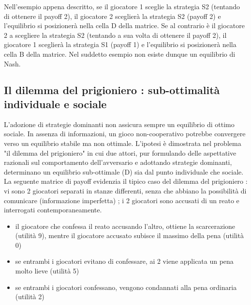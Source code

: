 Nell'esempio appena descritto, se il giocatore 1 sceglie la strategia S2 (tentando di ottenere il payoff 2), il giocatore 2 sceglierà la strategia S2 (payoff 2) e l'equilibrio si posizionerà nella cella D della matrice. Se al contrario è il giocatore 2 a scegliere la strategia S2 (tentando a sua volta di ottenere il payoff 2), il giocatore 1 sceglierà la strategia S1 (payoff 1) e l'equilibrio si posizionerà nella cella B della matrice. Nel suddetto esempio non esiste dunque un equilibrio di Nash.\\

\subsection{Il dilemma del prigioniero : sub-ottimalità individuale e sociale}
\justify
L'adozione di strategie dominanti non assicura sempre un equilibrio di ottimo sociale. In assenza di informazioni, un gioco non-cooperativo potrebbe convergere verso un equilibrio stabile ma non ottimale. L'ipotesi è dimostrata nel problema "il dilemma del prigioniero" in cui due attori, pur formulando delle aspettative razionali sul comportamento dell'avversario e adottando strategie dominanti, determinano un equilibrio sub-ottimale (D) sia dal punto individuale che sociale.\\
La seguente matrice di payoff evidenzia il tipico caso del dilemma del prigioniero : vi sono 2 giocatori separati in stanze differenti, senza che abbiano la possibilità di comunicare (informazione imperfetta) ; i 2 giocatori sono accusati di un reato e interrogati contemporaneamente.

\begin{itemize}
	\item il giocatore che confessa il reato accusando l'altro, ottiene la scarcerazione (utilità 9), mentre il giocatore accusato subisce il massimo della pena (utilità 0)
	\item se entrambi i giocatori evitano di confessare, ai 2 viene applicata un pena molto lieve (utilità 5)
	\item se entrambi i giocatori confessano, vengono condannati alla pena ordinaria (utilità 2)
\end{itemize}

